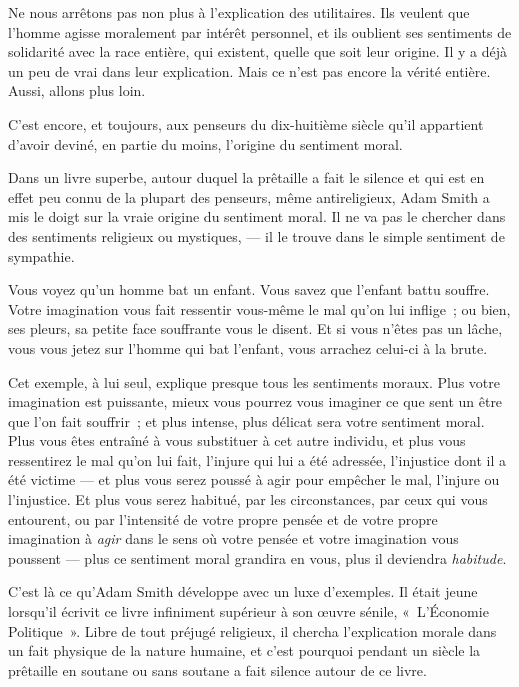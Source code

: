 \documentclass[french,twoside]{book} %
\begin{document}
Ne nous arrêtons pas non plus à l’explication des utilitaires. Ils veulent que l’homme agisse moralement par intérêt personnel, et ils oublient ses sentiments de solidarité avec la race entière, qui existent, quelle que soit leur origine. Il y a déjà un peu de vrai dans leur explication. Mais ce n’est pas encore la vérité entière. Aussi, allons plus loin.\par
\bigbreak
\noindent C’est encore, et toujours, aux penseurs du dix-huitième siècle qu’il appartient d’avoir deviné, en partie du moins, l’origine du sentiment moral.\par
Dans un livre superbe, autour duquel la prêtaille a fait le silence et qui est en effet peu connu de la plupart des penseurs, même antireligieux, Adam Smith a mis le doigt sur la vraie origine du sentiment moral. Il ne va pas le chercher dans des sentiments religieux ou mystiques, — il le trouve dans le simple sentiment de sympathie.\par
Vous voyez qu’un homme bat un enfant. Vous savez que l’enfant battu souffre. Votre imagination vous fait ressentir vous-même le mal qu’on lui inflige ; ou bien, ses pleurs, sa petite face souffrante vous le disent. Et si vous n’êtes pas un lâche, vous vous jetez sur l’homme qui bat l’enfant, vous arrachez celui-ci à la brute.\par
Cet exemple, à lui seul, explique presque tous les sentiments moraux. Plus votre imagination est puissante, mieux vous pourrez vous imaginer ce que sent un être que l’on fait souffrir ; et plus intense, plus délicat sera votre sentiment moral. Plus vous êtes entraîné à vous substituer à cet autre individu, et plus vous ressentirez le mal qu’on lui fait, l’injure qui lui a été adressée, l’injustice dont il a été victime — et plus  vous serez poussé à agir pour empêcher le mal, l’injure ou l’injustice. Et plus vous serez habitué, par les circonstances, par ceux qui vous entourent, ou par l’intensité de votre propre pensée et de votre propre imagination à \emph{agir} dans le sens où votre pensée et votre imagination vous poussent — plus ce sentiment moral grandira en vous, plus il deviendra \emph{habitude}.\par
C’est là ce qu’Adam Smith développe avec un luxe d’exemples. Il était jeune lorsqu’il écrivit ce livre infiniment supérieur à son œuvre sénile, « L’Économie Politique ». Libre de tout préjugé religieux, il chercha l’explication morale dans un fait physique de la nature humaine, et c’est pourquoi pendant un siècle la prêtaille en soutane ou sans soutane a fait silence autour de ce livre.\par
\end{document}
